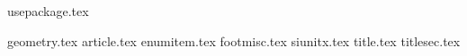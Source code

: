 
{usepackage.tex}


{geometry.tex}
%
{article.tex}
{enumitem.tex}
{footmisc.tex}
{siunitx.tex}
{title.tex}
{titlesec.tex}
